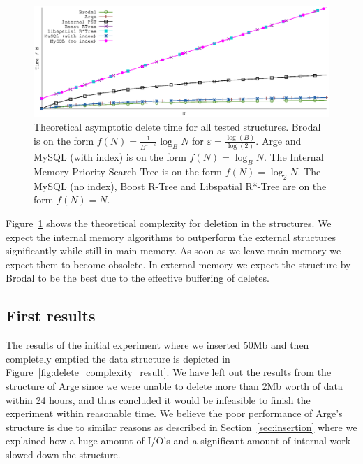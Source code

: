 \documentclass[twoside,11pt,openright]{report}
\def \epsilon {\varepsilon}
\begin{document}
\begin{figure}[htp!]
\centering
\includegraphics[width=1\textwidth]{../plots/delete_complexities/delete_complexity}
\caption{Theoretical asymptotic delete time for all tested structures. Brodal is on the form $f(N) = \frac{1}{B^{1-\epsilon}} \log_B N$ for $\epsilon = \frac{\log(B)}{\log(2)}$. Arge and MySQL (with index) is on the form $f(N) = \log_B N$. The Internal Memory Priority Search Tree is on the form $f(N) = \log_2 N$. The MySQL (no index), Boost R-Tree and Libspatial R*-Tree are on the form $f(N) = N$.}
\label{fig:theory_delete_complexity}
\end{figure}

Figure~\ref{fig:theory_delete_complexity} shows the theoretical complexity for deletion in the structures. We expect the internal memory algorithms to outperform the external structures significantly while still in main memory. As soon as we leave main memory we expect them to become obsolete. In external memory we expect the structure by Brodal to be the best due to the effective buffering of deletes.

\subsection*{First results}

The results of the initial experiment where we inserted 50Mb and then completely emptied the data structure is depicted in Figure~\ref{fig:delete_complexity_result}. We have left out the results from the structure of Arge since we were unable to delete more than 2Mb worth of data within 24 hours, and thus concluded it would be infeasible to finish the experiment within reasonable time. We believe the poor performance of Arge's structure is due to similar reasons as described in Section~\ref{sec:insertion} where we explained how a huge amount of I/O's and a significant amount of internal work slowed down the structure.
\end{document}
